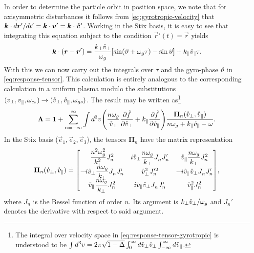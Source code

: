 \documentclass[aps,pre,notitlepage,amsmath,amssymb,amsfonts,nobibnotes,nofootinbib,superscriptaddress]{revtex4-1}
\begin{document}
In order to determine the particle orbit in position space, we note that for
axisymmetric disturbances it follows from \cref{eq:gyrotropic-velocity} that
$\bm{k}\cdot{}d\bm{r}'/dt'=\bm{k}\cdot\bm{v}'=\bm{k}\cdot\bm{\mathring{v}}'$. Working
in the Stix basis, it is easy to see that integrating this equation subject to
the condition $\vec{r}'(t)=\vec{r}$ yields
\begin{equation}
  \label{eq:k-dot-r}
  \vec{k}\cdot(\vec{r}-\vec{r}')
  = \frac{k_\perp\vc_\perp}{\omg}
  [\sin(\vartheta + \omg\tau) - \sin\vartheta]
  + k_\parallel\vc_\parallel\tau.
\end{equation}
With this we can now carry out the integrals over $\tau$ and the gyro-phase
$\vartheta$ in \cref{eq:response-tensor}. This calculation is entirely
analogous to the corresponding calculation in a uniform plasma \citep[see
e.g.][]{Ichimaru1973} modulo the substitutions
$(v_\perp,v_\parallel,\omega_{cs})\to(\mathring{v}_\perp,\mathring{v}_\parallel,\omega_{gs})$. The result
may be written as\footnote{The integral over velocity space in
  \cref{eq:response-tensor-gyrotropic} is understood to be
  $\int{}d^3v=2\pi\sqrt{1-\Delta}
  \int_0^\infty{}d\mathring{v}_\perp\mathring{v}_\perp\int_{-\infty}^\infty{}d\mathring{v}_\parallel$.}
\begin{equation}
  \label{eq:response-tensor-gyrotropic}
  \mathbf{\Lambda} =
  \mathbf{1} + \sum_{n=-\infty}^\infty\int d^3v\left(
    \frac{n\omg}{\vc_\perp}\pder{\hat{f}}{\vc_\perp}
    + k_\parallel\pder{\hat{f}}{\vc_\parallel}
  \right)
  \frac{\mathbf{\Pi}_n(\vc_\perp,\vc_\parallel)}
  {n\omg + k_\parallel\vc_\parallel - \omega}.
\end{equation}
In the Stix basis ($\vec{e}_1,\vec{e}_2,\vec{e}_3$), the tensors
$\mathbf{\Pi}_n$ have the matrix representation
\begingroup
\renewcommand*{\arraystretch}{2}
\begin{equation}
  \label{eq:Pi-tensor}
  \mathbf{\Pi}_n(\vc_\perp,\vc_\parallel) \doteq \left[\begin{matrix}
      \dfrac{n^2\omg^2}{k_\perp^2} J_n^2 &
      i\vc_\perp\dfrac{n\omg}{k_\perp} J^{}_n J_n' &
      \vc_\parallel\dfrac{n\omg}{k_\perp} J_n^2 \\
      -i\vc_\perp\dfrac{n\omg}{k_\perp} J^{}_n J_n' &
      \vc_\perp^2 J_n'^2 &
      -i\vc_\parallel\vc_\perp J^{}_n J_n' \\
      \vc_\parallel\dfrac{n\omg}{k_\perp} J_n^2 &
      i\vc_\parallel\vc_\perp J^{}_n J_n' &
      \vc_\parallel^2 J_n^2
  \end{matrix}\right],
\end{equation}
\endgroup
where $J_n$ is the Bessel function of order $n$. Its argument is
$k_\perp\mathring{v}_\perp/\omega_g$ and $J_n'$ denotes the derivative with respect to said
argument.
\end{document}
